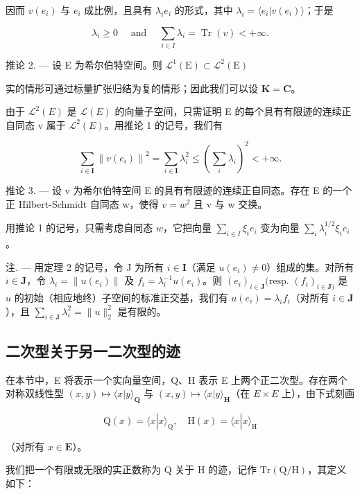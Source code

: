 因而 \(v(e_{i})\) 与 \(e_{i}\) 成比例，且具有 \(\lambda_{i}e_{i}\) 的形式，其中 \(\lambda_{i}=\langle e_{i}|v(e_{i})\rangle\)；于是

\[
\lambda_ {i} \geqslant 0 \quad \text { and } \quad \sum_ {i \in I} \lambda_ {i} = \operatorname{Tr} (v) <   + \infty .
\]

推论 2. --- 设 E 为希尔伯特空间。则 \(\mathcal{L}^{1}(\mathrm{E})\subset \mathcal{L}^{2}(\mathrm{E})\)

实的情形可通过标量扩张归结为复的情形；因此我们可以设 \(\mathbf{K} = \mathbf{C}\)。

由于 \(\mathcal{L}^{2}(E)\) 是 \(\mathcal{L}(E)\) 的向量子空间，只需证明 E 的每个具有有限迹的连续正自同态 v 属于 \(\mathcal{L}^{2}(E)\)。用推论 1 的记号，我们有

\[
\sum_ {i \in \mathbf {I}} \left\| v (e _ {i}) \right\| ^ {2} = \sum_ {i \in \mathbf {I}} \lambda_ {i} ^ {2} \leqslant (\sum_ {i} \lambda_ {i}) ^ {2} <   + \infty .
\]

推论 3. --- 设 v 为希尔伯特空间 E 的具有有限迹的连续正自同态。存在 E 的一个正 Hilbert-Schmidt 自同态 w，使得 \(v = w^{2}\) 且 v 与 w 交换。

用推论 1 的记号，只需考虑自同态 \(w\)，它把向量 \(\sum_{i\in I}\xi_i e_i\) 变为向量 \(\sum_{i}\lambda_i^{1 / 2}\xi_i e_i\)。

注. --- 用定理 2 的记号，令 J 为所有 \(i \in \mathbf{I}\)（满足 \(u(e_i) \neq 0\)）组成的集。对所有 \(i \in \mathbf{J}\)，令 \(\lambda_i = \| u(e_i)\|\) 及 \(f_i = \lambda_i^{-1}u(e_i)\)。则 \((e_i)_{i \in \mathbf{J}}(\text{resp. } (f_i)_{i \in \mathbf{J})}\) 是 \(u\) 的初始（相应地终）子空间的标准正交基，我们有 \(u(e_i) = \lambda_i f_i\)（对所有 \(i \in \mathbf{J}\)），且 \(\sum_{i \in \mathbf{J}} \lambda_i^2 = \| u\|_2^2\) 是有限的。

\subsection{二次型关于另一二次型的迹}

在本节中，E 将表示一个实向量空间，Q、H 表示 E 上两个正二次型。存在两个对称双线性型 \((x, y) \mapsto \langle x | y \rangle_{\mathbf{Q}}\) 与 \((x, y) \mapsto \langle x | y \rangle_{\mathbf{H}}\)（在 \(E \times E\) 上），由下式刻画

\[
\mathrm{Q} (x) = \langle x | x \rangle_ {\mathrm{Q}}, \quad \mathrm{H} (x) = \langle x | x \rangle_ {\mathrm{H}}
\]

（对所有 \(x \in \mathbf{E}\)）。

我们把一个有限或无限的实正数称为 Q 关于 H 的迹，记作 \(\mathrm{Tr}(\mathrm{Q}/\mathrm{H})\)，其定义如下：

